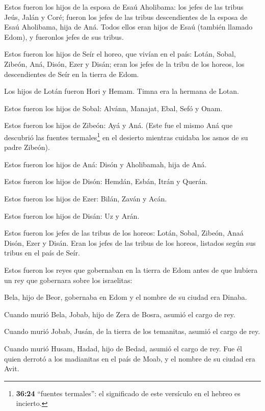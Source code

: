  Estos fueron los hijos de la esposa de Esaú Aholibama: los
jefes de las tribus Jeús, Jalán y Coré; fueron los jefes de las tribus
descendientes de la esposa de Esaú Aholibama, hija de Aná. 
Todos ellos eran hijos de Esaú (también llamado Edom), y fueronlos jefes
de sus tribus.

 Estos fueron los hijos de Seír el horeo, que vivían en el
país: Lotán, Sobal, Zibeón, Aná,  Disón, Ezer y Disán; eran
los jefes de la tribu de los horeos, los descendientes de Seír en la
tierra de Edom.

 Los hijos de Lotán fueron Hori y Hemam. Timna era la
hermana de Lotan.

 Estos fueron los hijos de Sobal: Alvánn, Manajat, Ebal,
Sefó y Onam.

 Estos fueron los hijos de Zibeón: Ayá y Aná. (Este fue el
mismo Aná que descubrió las fuentes termales\footnote{\textbf{36:24}
  ``fuentes termales'': el significado de este versículo en el hebreo es
  incierto.} en el desierto mientras cuidaba los asnos de su padre
Zibeón).

 Estos fueron los hijos de Aná: Disón y Aholibamah, hija de
Aná.

 Estos fueron los hijos de Disón: Hemdán, Esbán, Itrán y
Querán.

 Estos fueron los hijos de Ezer: Bilán, Zaván y Acán.

 Estos fueron los hijos de Disán: Uz y Arán.

 Estos fueron los jefes de las tribus de los horeos: Lotán,
Sobal, Zibeón, Anaá  Disón, Ezer y Disán. Eran los jefes de
las tribus de los horeos, listados según sus tribus en el país de Seír.

 Estos fueron los reyes que gobernaban en la tierra de Edom
antes de que hubiera un rey que gobernara sobre los israelitas:

 Bela, hijo de Beor, gobernaba en Edom y el nombre de su
ciudad era Dinaba.

 Cuando murió Bela, Jobab, hijo de Zera de Bosra, asumió el
cargo de rey.

 Cuando murió Jobab, Jusán, de la tierra de los temanitas,
asumió el cargo de rey.

 Cuando murió Husam, Hadad, hijo de Bedad, asumió el cargo
de rey. Fue él quien derrotó a los madianitas en el país de Moab, y el
nombre de su ciudad era Avit.

